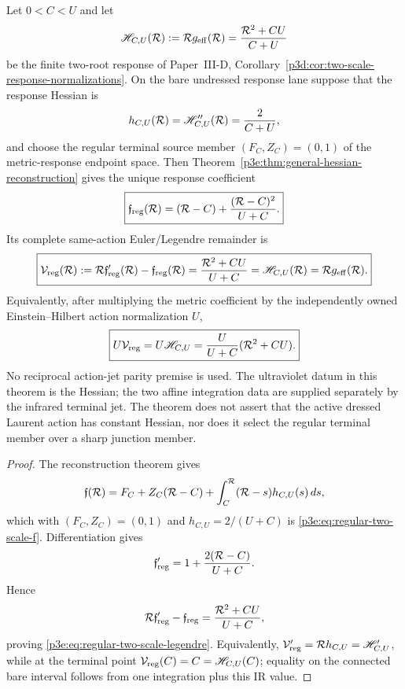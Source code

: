 \documentclass[12pt,a4paper]{article}
\begin{document}
\begin{theorem}
\label{p3e:thm:regular-two-scale-terminal-reconstruction}
Let \(0<C<U\) and let
\[
 \mathscr H_{C,U}(\mathcal R)
 :=\mathcal R g_{\rm eff}(\mathcal R)
 =\frac{\mathcal R^2+CU}{C+U}
\]
be the finite two-root response of
Paper~III-D, Corollary~\ref{p3d:cor:two-scale-response-normalizations}.
On the bare undressed response lane suppose that the response Hessian is
\[
 h_{C,U}(\mathcal R)=\mathscr H_{C,U}''(\mathcal R)=\frac{2}{C+U},
\]
and choose the regular terminal source member
\(
( F_C,Z_C)=(0,1)
\)
of the metric-response endpoint space.  Then
Theorem~\ref{p3e:thm:general-hessian-reconstruction} gives the unique
response coefficient
\begin{equation}
\label{p3e:eq:regular-two-scale-f}
 \boxed{
 \mathfrak f_{\rm reg}(\mathcal R)
 =(\mathcal R-C)+\frac{(\mathcal R-C)^2}{U+C}.}
\end{equation}
Its complete same-action Euler/Legendre remainder is
\begin{equation}
\label{p3e:eq:regular-two-scale-legendre}
 \boxed{
 \mathcal V_{\rm reg}(\mathcal R)
 :=\mathcal R\mathfrak f_{\rm reg}'(\mathcal R)-\mathfrak f_{\rm reg}(\mathcal R)
 =\frac{\mathcal R^2+CU}{U+C}
 =\mathscr H_{C,U}(\mathcal R)
 =\mathcal R g_{\rm eff}(\mathcal R).}
\end{equation}
Equivalently, after multiplying the metric coefficient by the independently
owned Einstein--Hilbert action normalization \(U\),
\[
 \boxed{U\mathcal V_{\rm reg}=U\mathscr H_{C,U}
 =\frac{U}{U+C}(\mathcal R^2+CU).}
\]
No reciprocal action-jet parity premise is used.  The ultraviolet datum in
this theorem is the Hessian; the two affine integration data are supplied
separately by the infrared terminal jet.  The theorem does not assert that
the active dressed Laurent action has constant Hessian, nor does it select
the regular terminal member over a sharp junction member.
\end{theorem}
\begin{proof}
The reconstruction theorem gives
\[
 \mathfrak f(\mathcal R)
 =F_C+Z_C(\mathcal R-C)
  +\int_C^{\mathcal R}(\mathcal R-s)h_{C,U}(s)\,ds,
\]
which with \((F_C,Z_C)=(0,1)\) and
\(h_{C,U}=2/(U+C)\) is
\eqref{p3e:eq:regular-two-scale-f}.  Differentiation gives
\[
 \mathfrak f_{\rm reg}'
 =1+\frac{2(\mathcal R-C)}{U+C}.
\]
Hence
\[
 \mathcal R\mathfrak f_{\rm reg}'-\mathfrak f_{\rm reg}
 =\frac{\mathcal R^2+CU}{U+C},
\]
proving \eqref{p3e:eq:regular-two-scale-legendre}.  Equivalently,
\(\mathcal V_{\rm reg}'=\mathcal R h_{C,U}
=\mathscr H_{C,U}'\), while at the terminal point
\(\mathcal V_{\rm reg}(C)=C=\mathscr H_{C,U}(C)\); equality on the
connected bare interval follows from one integration plus this IR value.
\end{proof}
\end{document}
